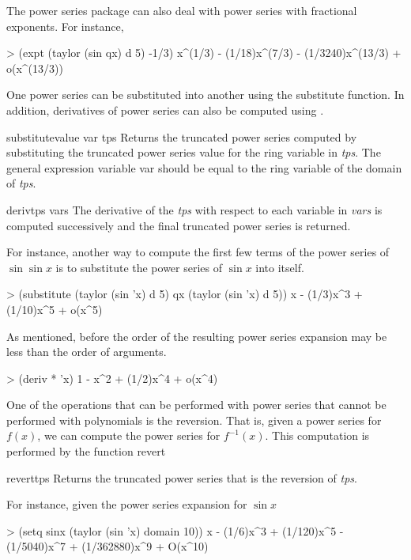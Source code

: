The power series package can also deal with power
series with fractional exponents. For instance,
\begin{code}  
> (expt (taylor (sin qx) d 5) -1/3)
x^(1/3) - (1/18)x^(7/3) - (1/3240)x^(13/3) + o(x^(13/3))
\end{code}
  
One power series can be substituted into another using the substitute
function. In addition, derivatives of power series can also be
computed using .
  
\begin{functiondef}{substitute}{value var tps}
Returns the truncated power series computed by substituting
the truncated power series value for the ring variable
in {\em tps}. The general expression variable var should be
equal to the ring variable of the domain of {\em tps}.
\end{functiondef}
  
\begin{functiondef}{deriv}{tps \rest vars}
The derivative of the {\em tps} with respect to each variable in {\em
vars} is computed successively and the final truncated power series is
returned.
\end{functiondef}
  
For instance, another way to compute the first few
terms of the power series of $\sin \sin x$ is to substitute the power
series of $\sin x$ into itself.
\begin{code}
> (substitute (taylor (sin 'x) d 5) qx (taylor (sin 'x) d 5))
x - (1/3)x^3 + (1/10)x^5 + o(x^5)
\end{code}
  
As mentioned, before the order of the resulting power series expansion
may be less than the order of arguments.
\begin{code}
> (deriv * 'x)
1 - x^2 + (1/2)x^4 + o(x^4)
\end{code}
  
One of the operations that can be performed with power series that
cannot be performed with polynomials is the reversion. That is, given
a power series for $f(x)$, we can compute the power series for
$f^{-1}(x)$.  This computation is performed by the function revert
  
\begin{functiondef}{revert}{tps}
Returns the truncated power series that is the reversion
of {\em tps}.
\end{functiondef}
  
For instance, given the power series expansion for $\sin x$ 
\begin{code}
> (setq sinx (taylor (sin 'x) domain 10))
x - (1/6)x^3 + (1/120)x^5 - (1/5040)x^7 + (1/362880)x^9 + O(x^10)
\end{code}

